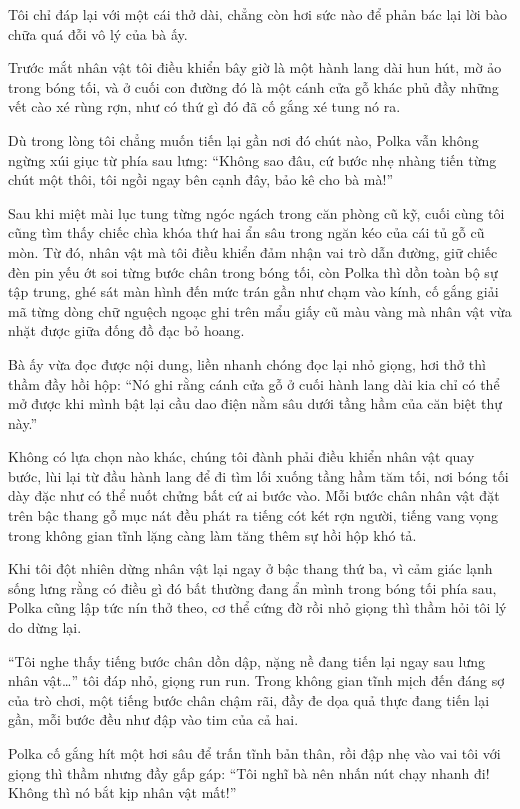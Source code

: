 \documentclass[../main.tex]{subfiles}
\begin{document}
Tôi chỉ đáp lại với một cái thở dài, chẳng còn hơi sức nào để phản bác lại lời bào chữa quá đỗi vô lý của bà ấy.

\ct

Trước mắt nhân vật tôi điều khiển bây giờ là một hành lang dài hun hút, mờ ảo trong bóng tối, và ở cuối con đường đó là một cánh cửa gỗ khác phủ đầy những vết cào xé rùng rợn, như có thứ gì đó đã cố gắng xé tung nó ra.

Dù trong lòng tôi chẳng muốn tiến lại gần nơi đó chút nào, Polka vẫn không ngừng xúi giục từ phía sau lưng: ``Không sao đâu, cứ bước nhẹ nhàng tiến từng chút một thôi, tôi ngồi ngay bên cạnh đây, bảo kê cho bà mà!''

Sau khi miệt mài lục tung từng ngóc ngách trong căn phòng cũ kỹ, cuối cùng tôi cũng tìm thấy chiếc chìa khóa thứ hai ẩn sâu trong ngăn kéo của cái tủ gỗ cũ mòn. Từ đó, nhân vật mà tôi điều khiển đảm nhận vai trò dẫn đường, giữ chiếc đèn pin yếu ớt soi từng bước chân trong bóng tối, còn Polka thì dồn toàn bộ sự tập trung, ghé sát màn hình đến mức trán gần như chạm vào kính, cố gắng giải mã từng dòng chữ nguệch ngoạc ghi trên mẩu giấy cũ màu vàng mà nhân vật vừa nhặt được giữa đống đồ đạc bỏ hoang.

Bà ấy vừa đọc được nội dung, liền nhanh chóng đọc lại nhỏ giọng, hơi thở thì thầm đầy hồi hộp: ``Nó ghi rằng cánh cửa gỗ ở cuối hành lang dài kia chỉ có thể mở được khi mình bật lại cầu dao điện nằm sâu dưới tầng hầm của căn biệt thự này.''

Không có lựa chọn nào khác, chúng tôi đành phải điều khiển nhân vật quay bước, lùi lại từ đầu hành lang để đi tìm lối xuống tầng hầm tăm tối, nơi bóng tối dày đặc như có thể nuốt chửng bất cứ ai bước vào. Mỗi bước chân nhân vật đặt trên bậc thang gỗ mục nát đều phát ra tiếng cót két rợn người, tiếng vang vọng trong không gian tĩnh lặng càng làm tăng thêm sự hồi hộp khó tả.

Khi tôi đột nhiên dừng nhân vật lại ngay ở bậc thang thứ ba, vì cảm giác lạnh sống lưng rằng có điều gì đó bất thường đang ẩn mình trong bóng tối phía sau, Polka cũng lập tức nín thở theo, cơ thể cứng đờ rồi nhỏ giọng thì thầm hỏi tôi lý do dừng lại.

``Tôi nghe thấy tiếng bước chân dồn dập, nặng nề đang tiến lại ngay sau lưng nhân vật\dots'' tôi đáp nhỏ, giọng run run. Trong không gian tĩnh mịch đến đáng sợ của trò chơi, một tiếng bước chân chậm rãi, đầy đe dọa quả thực đang tiến lại gần, mỗi bước đều như đập vào tim của cả hai.

Polka cố gắng hít một hơi sâu để trấn tĩnh bản thân, rồi đập nhẹ vào vai tôi với giọng thì thầm nhưng đầy gấp gáp: ``Tôi nghĩ bà nên nhấn nút chạy nhanh đi! Không thì nó bắt kịp nhân vật mất!''
\end{document}
